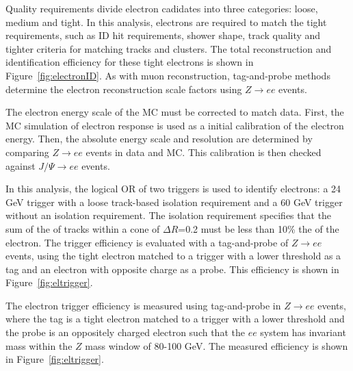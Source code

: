 Quality requirements divide electron cadidates into three categories: loose, medium and tight. In this analysis, electrons are required to match the tight requirements, such as ID hit requirements, shower shape, track quality and tighter criteria for matching tracks and clusters. The total reconstruction and identification efficiency for these tight electrons is shown in Figure~\ref{fig:electronID}. As with muon reconstruction, tag-and-probe methods determine the electron reconstruction scale factors using $Z\rightarrow ee$ events.

The electron energy scale of the MC must be corrected to match data. First, the MC simulation of electron response is used as a initial calibration of the electron energy. Then, the absolute energy scale and resolution are determined by comparing $Z\rightarrow ee$ events in data and MC. This calibration is then checked against $J/\Psi\rightarrow ee$ events.

In this analysis, the logical OR of two triggers is used to identify electrons: a 24 GeV trigger with a loose track-based isolation requirement and a 60 GeV trigger without an isolation requirement. The isolation requirement specifies that the sum of the \pt of tracks within a cone of $\Delta R$=0.2 must be less than 10\% the \pt of the electron. The trigger efficiency is evaluated with a tag-and-probe of $Z\rightarrow ee$ events, using the tight electron matched to a trigger with a lower threshold as a tag and an electron with opposite charge as a probe. This efficiency is shown in Figure~\ref{fig:eltrigger}.

 The electron trigger efficiency is measured using tag-and-probe in $Z\rightarrow ee$ events, where the tag is a tight electron matched to a trigger with a lower threshold and the probe is an oppositely charged electron such that the $ee$ system has invariant mass within the $Z$ mass window of 80-100 GeV. The measured efficiency is shown in Figure~\ref{fig:eltrigger}. 

